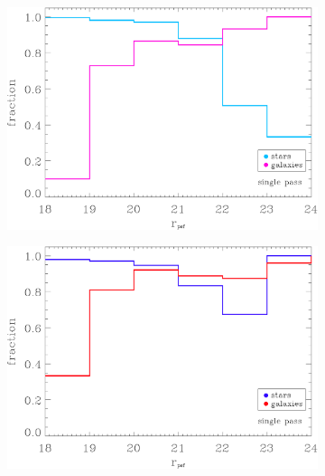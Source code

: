 \documentclass[12pt]{article}
\begin{document}
\begin{figure}[h!]
	\centering
	\begin{subfigure}[]{0.49\textwidth}
		\includegraphics[width=\textwidth]{final_figures/singlepass_completeness.eps}
	\end{subfigure}
	\begin{subfigure}[]{0.49\textwidth}
		\includegraphics[width=\textwidth]{final_figures/singlepass_purity.eps}
	\end{subfigure}
	

\end{figure}
\end{document}
